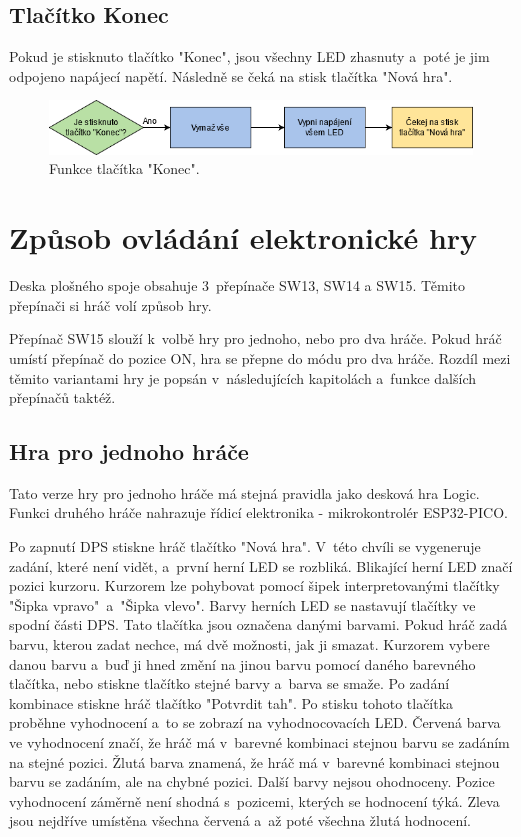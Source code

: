   \section{Tlačítko Konec}
  Pokud je stisknuto tlačítko "Konec", jsou všechny LED zhasnuty a~poté je jim odpojeno napájecí napětí. Následně se čeká na stisk tlačítka
  "Nová hra". 

  \begin{figure}[!h]
    \begin{center}
      \includegraphics[scale=0.6]{obrazky/Konec.png}
    \end{center}
    \caption[Funkce tlačítka Konec]{Funkce tlačítka "Konec".}
  \end{figure}

\chapter{Způsob ovládání elektronické hry}
Deska plošného spoje obsahuje 3~přepínače SW13, SW14 a SW15. Těmito přepínači si hráč volí způsob hry.

Přepínač SW15 slouží k~volbě hry pro jednoho, nebo pro dva hráče. Pokud hráč umístí přepínač do pozice ON, hra se přepne
do módu pro dva hráče. Rozdíl mezi těmito variantami hry je popsán v~následujících kapitolách a~funkce dalších přepínačů taktéž.

\section{Hra pro jednoho hráče}
Tato verze hry pro jednoho hráče má stejná pravidla jako desková hra Logic. Funkci druhého hráče nahrazuje řídicí elektronika
- mikrokontrolér ESP32-PICO.

Po zapnutí DPS stiskne hráč tlačítko "Nová hra". V~této chvíli se vygeneruje zadání, které není vidět, a~první herní LED se 
rozbliká. Blikající herní LED značí pozici kurzoru. 
Kurzorem lze pohybovat pomocí šipek interpretovanými tlačítky "Šipka vpravo"\  a~"Šipka vlevo". Barvy herních LED se nastavují 
tlačítky ve spodní části DPS. Tato tlačítka jsou označena danými barvami. Pokud hráč zadá barvu, kterou zadat nechce, má dvě možnosti,
jak ji smazat. Kurzorem vybere danou barvu a~buď ji hned změní na jinou barvu pomocí daného barevného tlačítka, nebo stiskne tlačítko 
stejné barvy a~barva se smaže. 
Po zadání kombinace stiskne hráč tlačítko "Potvrdit tah". Po stisku tohoto tlačítka proběhne vyhodnocení a~to se zobrazí na 
vyhodnocovacích LED. 
Červená barva ve vyhodnocení značí, že hráč má v~barevné kombinaci stejnou barvu se zadáním na stejné pozici. Žlutá barva znamená,
že hráč má v~barevné kombinaci stejnou barvu se zadáním, ale na chybné pozici. Další barvy nejsou ohodnoceny. Pozice vyhodnocení
záměrně není shodná s~pozicemi, kterých se hodnocení týká. Zleva jsou nejdříve umístěna všechna červená a~až poté všechna žlutá 
hodnocení.

